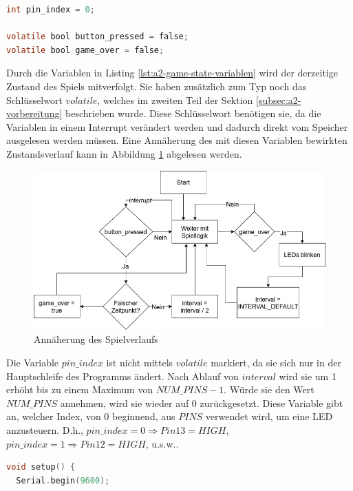 \begin{lstlisting}[language=C,label={lst:a2-game-state-variablen}, caption={Variablen zur Zustandsbestimmung des Spiels}]
int pin_index = 0;

volatile bool button_pressed = false;
volatile bool game_over = false;
\end{lstlisting}

Durch die Variablen in Listing \ref{lst:a2-game-state-variablen} wird der derzeitige Zustand des Spiels mitverfolgt.
Sie haben zusätzlich zum Typ noch das Schlüsselwort $volatile$, welches im zweiten Teil der Sektion \ref{subsec:a2-vorbereitung} beschrieben wurde.
Diese Schlüsselwort benötigen sie, da die Variablen in einem Interrupt verändert werden und dadurch direkt vom Speicher ausgelesen werden müssen.
Eine Annäherung des mit diesen Variablen bewirkten Zustandsverlauf kann in Abbildung \ref{fig:annäherung-des-spielverlaufs} abgelesen werden.

\begin{figure}[ht]
    \centering
    \includegraphics[width=\textwidth]{pictures/a2-game-state.png}
    \caption{Annäherung des Spielverlaufs}
    \label{fig:annäherung-des-spielverlaufs}
\end{figure}


Die Variable $pin\_index$ ist nicht mittels $volatile$ markiert, da sie sich nur in der Hauptschleife des Programms ändert.
Nach Ablauf von $interval$ wird sie um 1 erhöht bis zu einem Maximum von $NUM\_PINS - 1$.
Würde sie den Wert $NUM\_PINS$ annehmen, wird sie wieder auf 0 zurückgesetzt.
Diese Variable gibt an, welcher Index, von 0 beginnend, aus $PINS$ verwendet wird, um eine LED anzusteuern.
D.h., $pin\_index = 0 \Rightarrow Pin13 = HIGH$, $pin\_index = 1 \Rightarrow Pin12 = HIGH$, u.s.w..

\begin{lstlisting}[language=C,label={lst:a2-serial-begin}, caption={Einstellen der seriellen Schnittstelle}]
void setup() {
  Serial.begin(9600);
\end{lstlisting}

